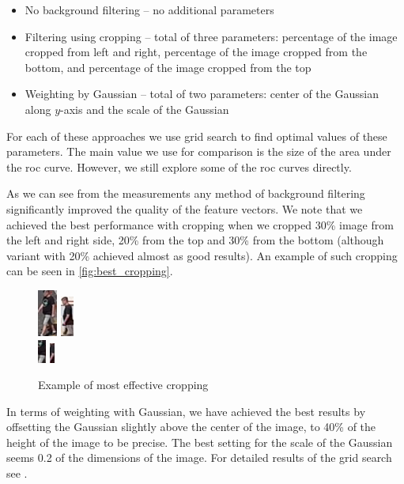 \begin{itemize}
    \item No background filtering -- no additional parameters
    \item Filtering using cropping -- total of three parameters: percentage of the image cropped from left and right, percentage of the image cropped from the bottom, and percentage of the image cropped from the top
    \item Weighting by Gaussian -- total of two parameters: center of the Gaussian along $y$-axis and the scale of the Gaussian
\end{itemize}

For each of these approaches we use grid search to find optimal values of
these parameters. The main value we use for comparison is the size of the
area under the \gls{roc} curve. However, we still explore some of the
\gls{roc} curves directly.

As we can see from the measurements  any method
of background filtering significantly improved the quality of the feature
vectors. We note that we achieved the best performance with cropping when we 
cropped 30\% image from the left and right side, 20\% from the top and 30\%
from the bottom (although variant with 20\% achieved almost as good results). An example of such cropping can be seen in
\autoref{fig:best_cropping}.

\begin{figure}
    \centering
    \includegraphics{img/0.png} \includegraphics{img/1.png} \\
    \includegraphics{img/0_crop.png} \includegraphics{img/1_crop.png}
    \caption{Example of most effective cropping}
    \label{fig:best_cropping}
\end{figure}

In terms of weighting with Gaussian, we have achieved the best results
by offsetting the Gaussian slightly above the center of the image, to 40\%
of the height of the image to be precise. The best setting for the scale
of the Gaussian seems 0.2 of the dimensions of the image. For detailed results
of the grid search see .

